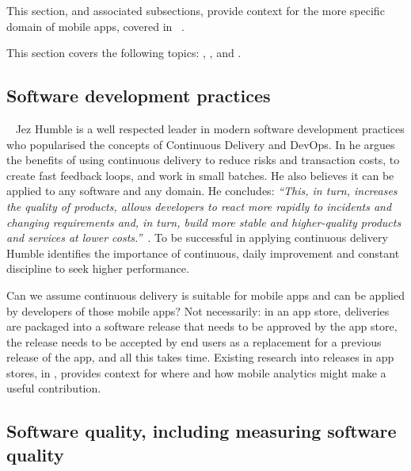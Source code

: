 This section, and associated subsections, provide context for the more specific domain of mobile apps, covered in ~.
 
This section covers the following topics: , , and .

\subsection{Software development practices}~\label{rw-software-development-practices-topic}
Jez Humble is a well respected leader in modern software development practices who popularised the concepts of Continuous Delivery and DevOps. In  he argues the benefits of using continuous delivery to reduce risks and transaction costs, to create fast feedback loops, and work in small batches. He also believes it can be applied to any software and any domain. He concludes: \emph{``This, in turn, increases the quality of products, allows developers to react more rapidly to incidents and changing requirements and, in turn, build more stable and higher-quality products and services at lower costs.''}~. To be successful in applying continuous delivery Humble identifies the importance of continuous, daily improvement and constant discipline to seek higher performance. 

Can we assume continuous delivery is suitable for mobile apps and can be applied by developers of those mobile apps? Not necessarily: in an app store, deliveries are packaged into a software release that needs to be approved by the app store, the release needs to be accepted by end users as a replacement for a previous release of the app, and all this takes time. Existing research into releases in app stores, in , provides context for where and how mobile analytics might make a useful contribution.

\subsection{Software quality, including measuring software quality}~\label{rw-software-quality-including-measurement-topic}

